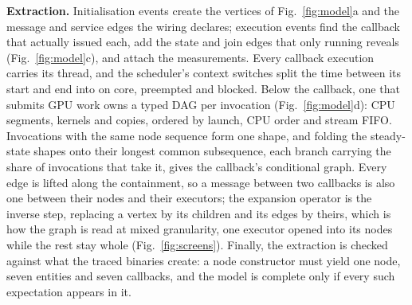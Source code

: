 \noindent\textbf{Extraction.} Initialisation events create the vertices of Fig.~\ref{fig:model}a and the message and service edges the wiring declares; execution events find the callback that actually issued each, add the state and join edges that only running reveals (Fig.~\ref{fig:model}c), and attach the measurements. Every callback execution carries its thread, and the scheduler's context switches split the time between its start and end into on core, preempted and blocked. Below the callback, one that submits GPU work owns a typed DAG per invocation (Fig.~\ref{fig:model}d): CPU segments, kernels and copies, ordered by launch, CPU order and stream FIFO. Invocations with the same node sequence form one shape, and folding the steady-state shapes onto their longest common subsequence, each branch carrying the share of invocations that take it, gives the callback's conditional graph. Every edge is lifted along the containment, so a message between two callbacks is also one between their nodes and their executors; the expansion operator is the inverse step, replacing a vertex by its children and its edges by theirs, which is how the graph is read at mixed granularity, one executor opened into its nodes while the rest stay whole (Fig.~\ref{fig:screens}). Finally, the extraction is checked against what the traced binaries create: a node constructor must yield one node, seven entities and seven callbacks, and the model is complete only if every such expectation appears in it.
